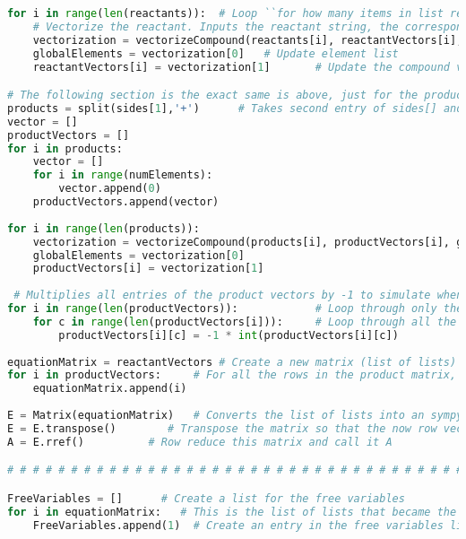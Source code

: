 \documentclass[10pt]{article}
\begin{document}
\begin{lstlisting}[language = Python]
for i in range(len(reactants)):  # Loop ``for how many items in list reactant'' times
	# Vectorize the reactant. Inputs the reactant string, the corresponding empty vector, and the list of elements
	vectorization = vectorizeCompound(reactants[i], reactantVectors[i], globalElements)
	globalElements = vectorization[0]  	# Update element list
	reactantVectors[i] = vectorization[1]		# Update the compound vectors.

# The following section is the exact same is above, just for the products of the equation
products = split(sides[1],'+')  	# Takes second entry of sides[] and splits it, these are the products
vector = []
productVectors = []
for i in products:
	vector = []
	for i in range(numElements):
		vector.append(0)
	productVectors.append(vector)
  
for i in range(len(products)):
	vectorization = vectorizeCompound(products[i], productVectors[i], globalElements)
	globalElements = vectorization[0]
	productVectors[i] = vectorization[1]
 
 # Multiplies all entries of the product vectors by -1 to simulate when we moved them across the equals sign.
for i in range(len(productVectors)):			# Loop through only the product vectors
	for c in range(len(productVectors[i])):		# Loop through all the entries in each vector
		productVectors[i][c] = -1 * int(productVectors[i][c])			# Multiply them all by -1
    
equationMatrix = reactantVectors # Create a new matrix (list of lists) that will store both reactant vectors and product vectors. This starts the list by copying the reactantVectors
for i in productVectors:     # For all the rows in the product matrix, add them to the matrix
	equationMatrix.append(i)
  
E = Matrix(equationMatrix)   # Converts the list of lists into an sympy matrix
E = E.transpose()        # Transpose the matrix so that the now row vectors become column vectors
A = E.rref()          # Row reduce this matrix and call it A

# # # # # # # # # # # # # # # # # # # # # # # # # # # # # # # # # # # # # # # # # # # # # # #

FreeVariables = []    	# Create a list for the free variables
for i in equationMatrix:   # This is the list of lists that became the matrix E. Since E got transposed, the number of items in this variable is the number of columns in the matrix E
	FreeVariables.append(1)  # Create an entry in the free variables list for every column of the matrix


\end{lstlisting}
\end{document}
